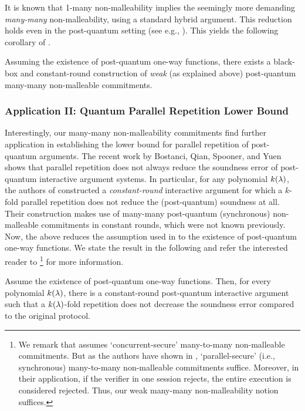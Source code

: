 It is known that 1-many non-malleability implies the seemingly more demanding {\em many-many} non-malleability, using a standard hybrid argument. This reduction holds even in the post-quantum setting (see e.g., \cite[Lemma 7.3]{EC:ABGKM21}). This yields the following corollary of . 

\begin{corollary}\label{cor:informal:many-many-NMC}
Assuming the existence of post-quantum one-way functions, there exists a black-box and constant-round construction of {\em weak} (as explained above) post-quantum many-many non-malleable commitments.
\end{corollary}


\subsubsection{Application II: Quantum Parallel Repetition Lower Bound} 

Interestingly, our many-many non-malleability commitments find further application in establishing the lower bound for parallel repetition of post-quantum arguments. The recent work by Bostanci, Qian, Spooner, and Yuen  \cite{bostanci2023efficient} shows that parallel repetition does not always reduce the soundness error of post-quantum interactive argument systems. In particular, for any polynomial $k(\lambda)$, the authors of \cite{bostanci2023efficient} constructed a {\em constant-round} interactive argument for which a $k$-fold parallel repetition does not reduce the (post-quantum) soundness at all. Their construction makes use of many-many post-quantum (synchronous) non-malleable commitments in constant rounds, which were not known previously. Now, the above  reduces the assumption used in \cite{bostanci2023efficient} to the existence of post-quantum one-way functions. We state the result in the following  and refer the interested reader to \cite[Theorem 1.6 and Section 6]{bostanci2023efficient}\footnote{We remark that \cite[Theorem 1.6]{bostanci2023efficient} assumes `concurrent-secure' many-to-many non-malleable commitments. But as the authors have shown in \cite[Section 6]{bostanci2023efficient}, `parallel-secure' (i.e., synchronous) many-to-many non-malleable commitments suffice. Moreover, in their application, if the verifier in one session rejects, the entire execution is considered rejected. Thus, our weak many-many non-malleability notion suffices.} for more information.
\begin{corollary}\label{cor:informal:parallel-rep}
Assume the existence of post-quantum one-way functions. Then, for every polynomial $k(\lambda)$,
there is a constant-round post-quantum interactive argument such that a $k(\lambda)$-fold repetition does not decrease the soundness error compared to the original protocol.
\end{corollary}

